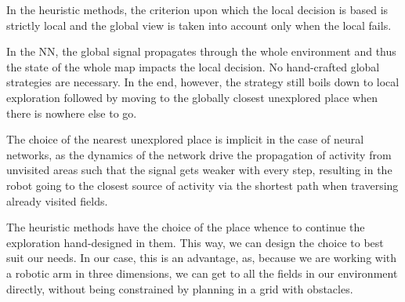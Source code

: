 \documentclass[buriama8_dp.tex]{subfiles}
\begin{document}
In the heuristic methods, the criterion upon which the local decision is based is strictly local and the global view is taken into account only when the local fails.

In the NN, the global signal propagates through the whole environment and thus the state of the whole map impacts the local decision. No hand-crafted global strategies are necessary. In the end, however, the strategy still boils down to local exploration followed by moving to the globally closest unexplored place when there is nowhere else to go.

The choice of the nearest unexplored place is implicit  in the case of neural networks, as the dynamics of the network drive the propagation of activity from unvisited areas such that the signal gets weaker with every step, resulting in the robot going to the closest source of activity via the shortest path when traversing already visited fields.

The heuristic methods have the choice of the place whence to continue the exploration hand-designed in them. This way, we can design the choice to best suit our needs. In our case, this is an advantage, as, because we are working with a robotic arm in three dimensions, we can get to all the fields in our environment directly, without being constrained by planning in a grid with obstacles.
\end{document}
